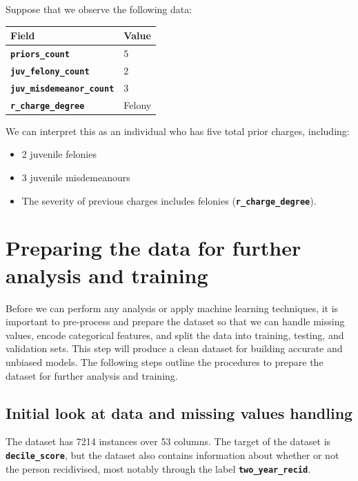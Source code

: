 Suppose that we observe the following data:

\begin{table}[!ht]
	\centering
	\begin{tabular}{|l|l|}
		\hline
		Field & Value \\ \hline
		\textbf{\texttt{priors\_count}} & 5 \\ \hline
		\textbf{\texttt{juv\_felony\_count}} & 2 \\ \hline
		\textbf{\texttt{juv\_misdemeanor\_count}} & 3 \\ \hline
		\textbf{\texttt{r\_charge\_degree}} & Felony \\ \hline
	\end{tabular}
\end{table}

We can interpret this as an individual who has five total prior charges, including:

\begin{itemize}
	\item 2 juvenile felonies
	\item 3 juvenile misdemeanours
	\item The severity of previous charges includes felonies (\textbf{\texttt{r\_charge\_degree}}).
\end{itemize}


\section{Preparing the data for further analysis and training}

Before we can perform any analysis or apply machine learning techniques, it is important to pre-process and prepare the dataset so that we can handle missing values, encode categorical features, and split the data into training, testing, and validation sets. This step will produce a clean dataset for building accurate and unbiased models. The following steps outline the procedures to prepare the dataset for further analysis and training.


\subsection{Initial look at data and missing values handling}

The dataset has 7214 instances over 53 columns. The target of the dataset is \textbf{\texttt{decile\_score}}, but the dataset also contains information about whether or not the person recidivised, most notably through the label \textbf{\texttt{two\_year\_recid}}. 

